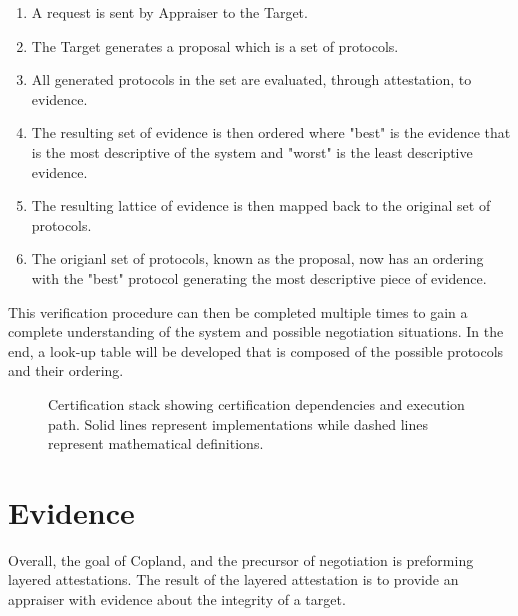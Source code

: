 \documentclass[10pt]{report}
\begin{document}
\begin{enumerate}
\item A request is sent by Appraiser to the Target.
\item The Target generates a proposal which is a set of protocols.
\item All generated protocols in the set are evaluated, through attestation, to evidence. 
\item The resulting set of evidence is then ordered where "best" is the evidence that is the most descriptive of the system and "worst" is the least descriptive evidence. 
\item The resulting lattice of evidence is then mapped back to the original set of protocols. 
\item The origianl set of protocols, known as the proposal, now has an ordering with the "best" protocol generating the most descriptive piece of evidence.
\end{enumerate}

This verification procedure can then be completed multiple times to gain a complete understanding of the system and possible negotiation situations. In the end, a look-up table will be developed that is composed of the possible protocols and their ordering. 

\begin{figure}[hbtp]
  \centering
  
  \caption[Certification Figure]{Certification stack showing
    certification dependencies and execution path. Solid lines
    represent implementations while dashed lines represent
    mathematical definitions.}
  \label{fig:certification-fig}
\end{figure}

\section {Evidence}

Overall, the goal of Copland, and the precursor of negotiation is preforming layered attestations.  The result of the layered attestation is to provide an appraiser with evidence about the integrity of a target. 
\end{document}
